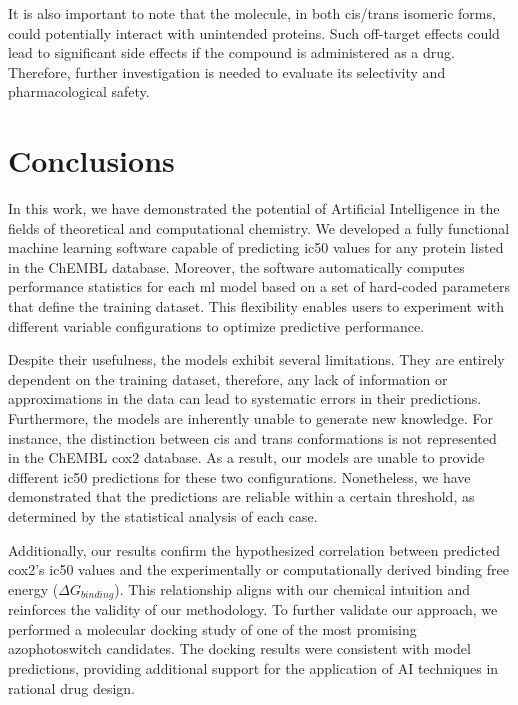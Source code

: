 \documentclass[11pt]{article}
\begin{document}
It is also important to note that the molecule, in both cis/trans isomeric forms, could potentially interact with unintended proteins. Such off-target effects could lead to significant side effects if the compound is administered as a drug. Therefore, further investigation is needed to evaluate its selectivity and pharmacological safety.

\newpage
\section{Conclusions}

\hspace{0.55cm}In this work, we have demonstrated the potential of Artificial Intelligence in the fields of theoretical and computational chemistry. We developed a fully functional machine learning software capable of predicting \gls{ic50} values for any protein listed in the ChEMBL database. Moreover, the software automatically computes performance statistics for each \gls{ml} model based on a set of hard-coded parameters that define the training dataset. This flexibility enables users to experiment with different variable configurations to optimize predictive performance.

Despite their usefulness, the models exhibit several limitations. They are entirely dependent on the training dataset, therefore, any lack of information or approximations in the data can lead to systematic errors in their predictions. Furthermore, the models are inherently unable to generate new knowledge. For instance, the distinction between cis and trans conformations is not represented in the ChEMBL \gls{cox2} database. As a result, our models are unable to provide different \gls{ic50} predictions for these two configurations. Nonetheless, we have demonstrated that the predictions are reliable within a certain threshold, as determined by the statistical analysis of each case.

Additionally, our results confirm the hypothesized correlation between predicted \gls{cox2}'s \gls{ic50} values and the experimentally or computationally derived binding free energy ($\Delta G_{binding}$). This relationship aligns with our chemical intuition and reinforces the validity of our methodology. To further validate our approach, we performed a molecular docking study of one of the most promising azophotoswitch candidates. The docking results were consistent with model predictions, providing additional support for the application of AI techniques in rational drug design.
\end{document}
